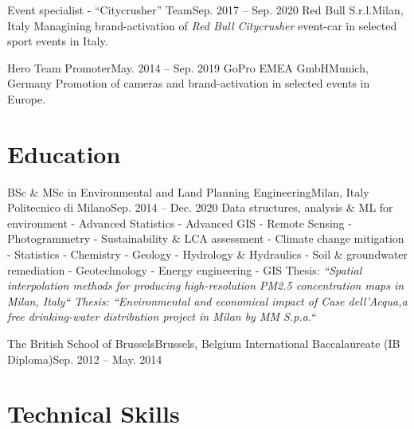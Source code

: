 \documentclass[letterpaper,11pt]{article}
\begin{document}
\sectionElement
{Event specialist - “Citycrusher” Team}{Sep. 2017 -- Sep. 2020}
{Red Bull S.r.l.}{Milan, Italy}
{Managining brand-activation of \textit{Red Bull Citycrusher} event-car in selected sport
  events in Italy.}
{}

\sectionElement
{Hero Team Promoter}{May. 2014 -- Sep. 2019}
{GoPro EMEA GmbH}{Munich, Germany}
{Promotion of cameras and brand-activation in selected events in Europe.}
{}
\sectionElementListEnd


\section{Education}
\sectionElementListStart

\sectionElement
{BSc \& MSc in Environmental and Land Planning Engineering}{Milan, Italy}
{Politecnico di Milano}{Sep. 2014 -- Dec. 2020}
{\scriptsize Data structures, analysis \& ML for environment - Advanced Statistics - Advanced GIS -
  Remote Sensing - Photogrammetry -
  Sustainability \& LCA assessment - Climate change mitigation\newline
  - Statistics - Chemistry - Geology - Hydrology \& Hydraulics
  - Soil \& groundwater remediation - Geotechnology - Energy engineering - GIS\newline
  \scriptsize Thesis: \it “Spatial interpolation methods for producing high-resolution PM2.5 
    concentration maps in Milan, Italy“
  \scriptsize Thesis: \it “Environmental and economical impact of Case dell'Acqua,a 
    free drinking-water distribution project in Milan by MM S.p.a.“
}
{}

\sectionElement
{The British School of Brussels}{Brussels, Belgium}
{International Baccalaureate (IB Diploma)}{Sep. 2012 -- May. 2014}
{}{}

\sectionElementListEnd

\section{Technical Skills}
\end{document}
